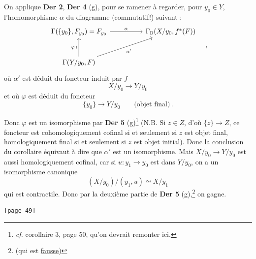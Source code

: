 \noindent On applique \textbf{Der 2}, \textbf{Der 4} (g), pour se ramener à regarder, pour $y_{0} \in Y$, l'homomorphisme $\alpha$ du diagramme (commutatif!) suivant :
\[
\begin{tikzcd}[row sep=large, column sep=huge]
\Gamma(\{y_{0}\}, F_{y_{0}}) = F_{y_{0}} \arrow[r, "\alpha"] & \Gamma_{\D}(X/y_{0}, f^{*}(F)) \\
\Gamma(Y/y_{0}, F) \arrow[u, "\varphi\,\wr"] \arrow[ur, "\alpha'"'] &
\end{tikzcd}
\quad ,
\]
où $\alpha'$ est déduit du foncteur induit par $f$
\[ X/y_{0} \longrightarrow Y/y_{0} \]
et où $\varphi$ est déduit du foncteur
\[ \{y_{0}\} \longrightarrow Y/y_{0} \qquad \text{(objet final)}\,. \]



\noindent Donc $\varphi$ est un isomorphisme par \textbf{Der 5} (g)\footnote[17]{\textit{cf.} corollaire 3, page 50, qu'on devrait remonter ici.} (N.B. Si $z \in Z$, d'où $\{z\} \to Z$, ce foncteur est cohomologiquement cofinal si et seulement si $z$ est objet final, homologiquement final si et seulement si $z$ est objet initial). Donc la conclusion du corollaire équivaut à dire que $\alpha'$ est un isomorphisme. Mais $X/y_{0} \to Y/y_{0}$ est aussi homologiquement cofinal, car si $u : y_{1} \to y_{0}$ est dans $Y/y_{0}$, on a un isomorphisme canonique
\[ (X/y_{0})/(y_{1}, u) \simeq X/y_{1} \]
qui est contractile. Donc par la deuxième partie de \textbf{Der 5} (g),\footnote[18]{(qui est \underline{fausse})} on gagne.

\noindent{}\texttt{[page 49]}

